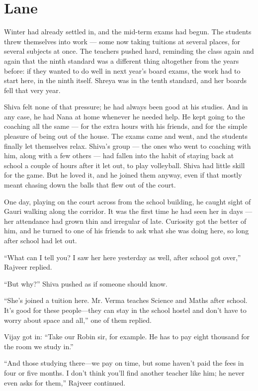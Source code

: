 \chapter{Lane}

Winter had already settled in, and the mid-term exams had begun. The students threw themselves into work — some now taking tuitions at several places, for several subjects at once. The teachers pushed hard, reminding the class again and again that the ninth standard was a different thing altogether from the years before: if they wanted to do well in next year's board exams, the work had to start here, in the ninth itself. Shreya was in the tenth standard, and her boards fell that very year.

Shiva felt none of that pressure; he had always been good at his studies. And in any case, he had Nana at home whenever he needed help. He kept going to the coaching all the same — for the extra hours with his friends, and for the simple pleasure of being out of the house. The exams came and went, and the students finally let themselves relax. Shiva's group — the ones who went to coaching with him, along with a few others — had fallen into the habit of staying back at school a couple of hours after it let out, to play volleyball. Shiva had little skill for the game. But he loved it, and he joined them anyway, even if that mostly meant chasing down the balls that flew out of the court.

One day, playing on the court across from the school building, he caught sight of Gauri walking along the corridor. It was the first time he had seen her in days — her attendance had grown thin and irregular of late. Curiosity got the better of him, and he turned to one of his friends to ask what she was doing here, so long after school had let out.

``What can I tell you? I saw her here yesterday as well, after school got over,'' Rajveer replied.

``But why?'' Shiva pushed as if someone should know.

``She's joined a tuition here. Mr. Verma teaches Science and Maths after school. It's good for these people—they can stay in the school hostel and don't have to worry about space and all,'' one of them replied.

Vijay got in: ``Take our Robin sir, for example. He has to pay eight thousand for the room we study in.''

``And those studying there—we pay on time, but some haven't paid the fees in four or five months. I don't think you'll find another teacher like him; he never even asks for them,'' Rajveer continued.

